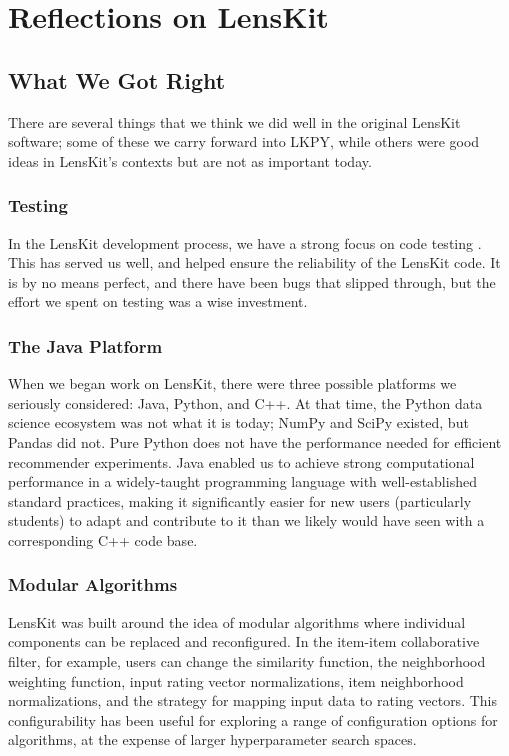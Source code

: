 \section{Reflections on LensKit}

\subsection{What We Got Right}

There are several things that we think we did well in the original LensKit software; some of these we carry forward into LKPY, while others were good ideas in LensKit's contexts but are not as important today.

\subsubsection{Testing}
In the LensKit development process, we have a strong focus on code testing \citep{Ekstrand2016-vr}. This has served us well, and helped ensure the reliability of the LensKit code.
It is by no means perfect, and there have been bugs that slipped through, but the effort we spent on testing was a wise investment.

\subsubsection{The Java Platform}
When we began work on LensKit, there were three possible platforms we seriously considered: Java, Python, and C++.
At that time, the Python data science ecosystem was not what it is today; NumPy and SciPy existed, but Pandas did not.
Pure Python does not have the performance needed for efficient recommender experiments.
Java enabled us to achieve strong computational performance in a widely-taught programming language with well-established standard practices, making it significantly easier for new users (particularly students) to adapt and contribute to it than we likely would have seen with a corresponding C++ code base.

\subsubsection{Modular Algorithms}
LensKit was built around the idea of modular algorithms where individual components can be replaced and reconfigured.
In the item-item collaborative filter, for example, users can change the similarity function, the neighborhood weighting function, input rating vector normalizations, item neighborhood normalizations, and the strategy for mapping input data to rating vectors.
This configurability has been useful for exploring a range of configuration options for algorithms, at the expense of larger hyperparameter search spaces.


